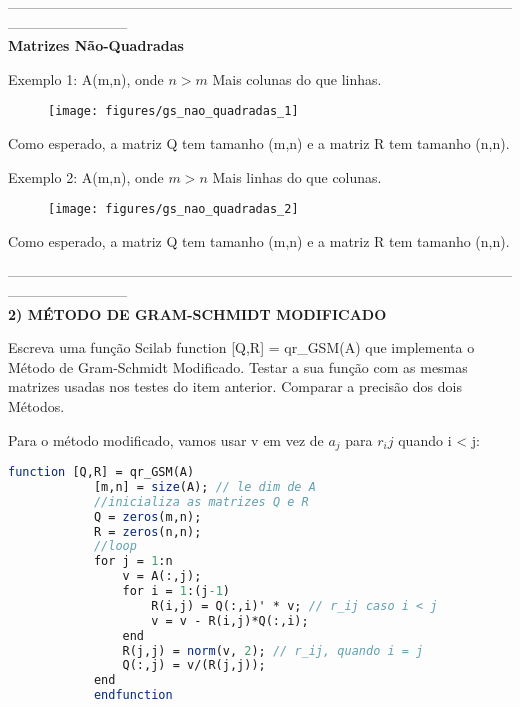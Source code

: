 \documentclass[leqno]{article}
\numberwithin{equation}{section}
\begin{document}
		--------------------------------------------------------------------------------------------------------------------------------------\\
		\newpage
		\noindent \textbf{{\large Matrizes Não-Quadradas}}
		
		Exemplo 1: A(m,n), onde $n > m$ Mais colunas do que linhas.
		
		\begin{figure}[H]
			\centering
			\texttt{[image: figures/gs\_nao\_quadradas\_1]}		
		\end{figure}
	
		Como esperado, a matriz Q tem tamanho (m,n) e a matriz R tem tamanho (n,n).
	
		Exemplo 2: A(m,n), onde $m > n$ Mais linhas do que colunas.
		
		\begin{figure}[H]
			\centering
			\texttt{[image: figures/gs\_nao\_quadradas\_2]}		
		\end{figure}
	
		Como esperado, a matriz Q tem tamanho (m,n) e a matriz R tem tamanho (n,n).
		
		--------------------------------------------------------------------------------------------------------------------------------------\\
	
		\noindent\textbf{{\large	2) MÉTODO DE GRAM-SCHMIDT MODIFICADO}}
		
	\begin{tcolorbox}[colback=green!5,colframe=green!40!black]
		Escreva uma função Scilab function [Q,R] = qr\_GSM(A) que implementa o Método de Gram-Schmidt Modificado.
		Testar a sua função com as mesmas matrizes usadas nos testes do item anterior. Comparar a precisão dos dois Métodos.
	\end{tcolorbox}

	\noindent Para o método modificado, vamos usar v em vez de $a_j$ para $r_ij$ quando i < j:
	
	\begin{sol}			
		\begin{lstlisting}[style=mystyle, language=Scilab]
			function [Q,R] = qr_GSM(A)
			[m,n] = size(A); // le dim de A
			//inicializa as matrizes Q e R
			Q = zeros(m,n);
			R = zeros(n,n);
			//loop
			for j = 1:n
				v = A(:,j);
				for i = 1:(j-1)
					R(i,j) = Q(:,i)' * v; // r_ij caso i < j
					v = v - R(i,j)*Q(:,i);
				end
				R(j,j) = norm(v, 2); // r_ij, quando i = j
				Q(:,j) = v/(R(j,j));
			end
			endfunction
		\end{lstlisting}
	\end{sol}
\end{document}
